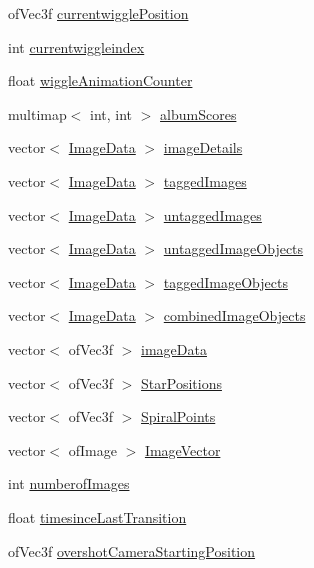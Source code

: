 \begin{DoxyCompactItemize}
of\-Vec3f \hyperlink{classtest_app_af81358868ae15faab1974ec074b1509f}{currentwiggle\-Position}
\item 
int \hyperlink{classtest_app_a6b9af0b1ae4a2c0530eb6a8cf8340751}{currentwiggleindex}
\item 
float \hyperlink{classtest_app_a6073b33be7847d675ec089a1d514c506}{wiggle\-Animation\-Counter}
\item 
multimap$<$ int, int $>$ \hyperlink{classtest_app_aa16e3bba73f9adb3c6363ac429e5a472}{album\-Scores}
\item 
vector$<$ \hyperlink{struct_image_data}{Image\-Data} $>$ \hyperlink{classtest_app_adcd4c3dfc7257326a79e6a3fc8b33406}{image\-Details}
\item 
vector$<$ \hyperlink{struct_image_data}{Image\-Data} $>$ \hyperlink{classtest_app_a7f7226fc54fdb7d06366ed0fa3ab7ee3}{tagged\-Images}
\item 
vector$<$ \hyperlink{struct_image_data}{Image\-Data} $>$ \hyperlink{classtest_app_a9cb9aa0700c4c8b316329a86c4e650ec}{untagged\-Images}
\item 
vector$<$ \hyperlink{struct_image_data}{Image\-Data} $>$ \hyperlink{classtest_app_ae31cc868f554f62b4c6e4e9db3b4155b}{untagged\-Image\-Objects}
\item 
vector$<$ \hyperlink{struct_image_data}{Image\-Data} $>$ \hyperlink{classtest_app_af65c8dc2f4620bfe7fdf6a39043cb48d}{tagged\-Image\-Objects}
\item 
vector$<$ \hyperlink{struct_image_data}{Image\-Data} $>$ \hyperlink{classtest_app_aced9b8a8419c8465877c2c9cd43f8934}{combined\-Image\-Objects}
\item 
vector$<$ of\-Vec3f $>$ \hyperlink{classtest_app_a500cd1228b3364bf30c8fb185e375688}{image\-Data}
\item 
vector$<$ of\-Vec3f $>$ \hyperlink{classtest_app_a68d0d30cea64a9d39a1b2deef16677ad}{Star\-Positions}
\item 
vector$<$ of\-Vec3f $>$ \hyperlink{classtest_app_af0dd2f3e3aabdb43bee49d74c156dc05}{Spiral\-Points}
\item 
vector$<$ of\-Image $>$ \hyperlink{classtest_app_ad4de5d6e6e8f3b8bb7424e62792deb1f}{Image\-Vector}
\item 
int \hyperlink{classtest_app_a957cf7fdb3ea964a88ca1be13e4d68fc}{numberof\-Images}
\item 
float \hyperlink{classtest_app_acb60fb8a89e9ec5d461630a20b11ceda}{timesince\-Last\-Transition}
\item 
of\-Vec3f \hyperlink{classtest_app_a846feea7c2c4d4b1929bb72c546b3e19}{overshot\-Camera\-Starting\-Position}

\end{DoxyCompactItemize}
